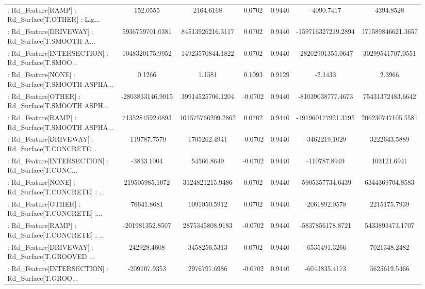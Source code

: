\begin{longtable}{p{4cm}cccccc}
 : Rd\_Feature[RAMP] : Rd\_Surface[T.OTHER] : Lig... &          152.0555 &         2164.6168 &  0.0702 &       0.9440 &         -4090.7417 &         4394.8528 \\
 : Rd\_Feature[DRIVEWAY] : Rd\_Surface[T.SMOOTH A... &   5936759701.0381 &  84513926216.3117 &  0.0702 &       0.9440 & -159716327219.2894 & 171589846621.3657 \\
 : Rd\_Feature[INTERSECTION] : Rd\_Surface[T.SMOO... &   1048320175.9952 &  14923570844.1822 &  0.0702 &       0.9440 &  -28202901355.0647 &  30299541707.0551 \\
 : Rd\_Feature[NONE] : Rd\_Surface[T.SMOOTH ASPHA... &            0.1266 &            1.1581 &  0.1093 &       0.9129 &            -2.1433 &            2.3966 \\
 : Rd\_Feature[OTHER] : Rd\_Surface[T.SMOOTH ASPH... &  -2803833146.9015 &  39914525706.1204 & -0.0702 &       0.9440 &  -81039038777.4673 &  75431372483.6642 \\
 : Rd\_Feature[RAMP] : Rd\_Surface[T.SMOOTH ASPHA... &   7135284592.0893 & 101575766209.2862 &  0.0702 &       0.9440 & -191960177921.3795 & 206230747105.5581 \\
 : Rd\_Feature[DRIVEWAY] : Rd\_Surface[T.CONCRETE... &      -119787.7570 &      1705262.4941 & -0.0702 &       0.9440 &      -3462219.1029 &      3222643.5889 \\
 : Rd\_Feature[INTERSECTION] : Rd\_Surface[T.CONC... &        -3833.1004 &        54566.8649 & -0.0702 &       0.9440 &       -110787.8949 &       103121.6941 \\
 : Rd\_Feature[NONE] : Rd\_Surface[T.CONCRETE] : ... &    219505985.1072 &   3124821215.9486 &  0.0702 &       0.9440 &   -5905357734.6439 &   6344369704.8583 \\
 : Rd\_Feature[OTHER] : Rd\_Surface[T.CONCRETE] :... &        76641.8681 &      1091050.5912 &  0.0702 &       0.9440 &      -2061892.0578 &      2215175.7939 \\
 : Rd\_Feature[RAMP] : Rd\_Surface[T.CONCRETE] : ... &   -201981352.8507 &   2875345808.9183 & -0.0702 &       0.9440 &   -5837856178.8721 &   5433893473.1707 \\
 : Rd\_Feature[DRIVEWAY] : Rd\_Surface[T.GROOVED ... &       242928.4608 &      3458256.5313 &  0.0702 &       0.9440 &      -6535491.3266 &      7021348.2482 \\
 : Rd\_Feature[INTERSECTION] : Rd\_Surface[T.GROO... &      -209107.9353 &      2976797.6986 & -0.0702 &       0.9440 &      -6043835.4173 &      5625619.5466 \\

\end{longtable}
